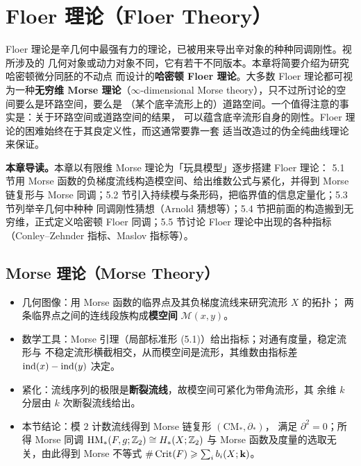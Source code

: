 \chapter{Floer 理论（Floer Theory）}

Floer 理论是辛几何中最强有力的理论，已被用来导出辛对象的种种同调刚性。视所涉及的
几何对象或动力对象不同，它有若干不同版本。本章将简要介绍为研究哈密顿微分同胚的不动点
而设计的\textbf{哈密顿 Floer 理论}。大多数 Floer 理论都可视为一种\textbf{无穷维 Morse
理论}（$\infty$-dimensional Morse theory），只不过所讨论的空间要么是环路空间，要么是
（某个底辛流形上的）道路空间。一个值得注意的事实是：关于环路空间或道路空间的结果，
可以蕴含底辛流形自身的刚性。Floer 理论的困难始终在于其良定义性，而这通常要靠一套
适当改造过的伪全纯曲线理论来保证。


\noindent\textbf{本章导读。}本章以有限维 Morse 理论为「玩具模型」逐步搭建 Floer 理论：
5.1 节用 Morse 函数的负梯度流线构造模空间、给出维数公式与紧化，并得到 Morse 链复形与
Morse 同调；5.2 节引入持续模与条形码，把临界值的信息定量化；5.3 节列举辛几何中种种
同调刚性猜想（Arnold 猜想等）；5.4 节把前面的构造搬到无穷维，正式定义哈密顿 Floer
同调；5.5 节讨论 Floer 理论中出现的各种指标（Conley–Zehnder 指标、Maslov 指标等）。

\section{Morse 理论（Morse Theory）}

\begin{keytakeaways}
\begin{itemize}
  \item 几何图像：用 Morse 函数的临界点及其负梯度流线来研究流形 $X$ 的拓扑；
        两条临界点之间的连线段族构成\textbf{模空间} $\mathcal M(x,y)$。
  \item 数学工具：Morse 引理（局部标准形 (5.1)）给出指标；对通有度量，稳定流形与
        不稳定流形横截相交，从而模空间是流形，其维数由指标差 $\operatorname{ind}(x)-\operatorname{ind}(y)$ 决定。
  \item 紧化：流线序列的极限是\textbf{断裂流线}，故模空间可紧化为带角流形，其
        余维 $k$ 分层由 $k$ 次断裂流线给出。
  \item 本节结论：模 $2$ 计数流线得到 Morse 链复形 $(\mathrm{CM}_*,\partial_*)$，
        满足 $\partial^2=0$；所得 Morse 同调 $\mathrm{HM}_*(F,g;\mathbb{Z}_2)\cong H_*(X;\mathbb{Z}_2)$
        与 Morse 函数及度量的选取无关，由此得到 Morse 不等式
        $\#\operatorname{Crit}(F)\geqslant\sum_i b_i(X;\mathbf k)$。
\end{itemize}
\end{keytakeaways}

